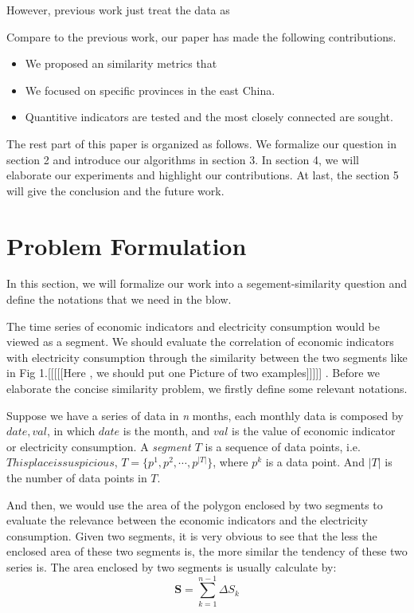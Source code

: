 \documentclass{sig-alternate-05-2015}
\begin{document}
However, previous work just treat the data as 

Compare to the previous work, our paper has made the following contributions.
\begin{itemize}
	\item We proposed an similarity metrics that 
	\item We focused on specific provinces in the east China.
	\item Quantitive indicators are tested and the most closely connected are sought.
\end{itemize}

The rest part of this paper is organized as follows. We formalize our question in section 2 and introduce our algorithms in section 3. In section 4, we will elaborate our experiments and highlight our contributions. At last, the section 5 will give the conclusion and the future work.

\section{Problem Formulation}
In this section, we will formalize our work into a segement-similarity question and define the notations that we need in the blow.

The time series of economic indicators and electricity consumption would be viewed as a segment. We should evaluate the correlation of economic indicators with electricity consumption through the similarity between the two segments like in Fig 1.[[[[[Here , we should  put one Picture of two examples]]]]] . Before we elaborate the concise similarity problem, we firstly define some relevant notations.
\newcommand{\loci}[1]{\ensuremath{p^{#1}}}
\begin{definition}
Suppose we have a series of data in \textit{n} months, each monthly data is composed by \textbf{\(date, val\)}, in which $date$ is the month, and $val$ is the value of economic indicator or electricity consumption. A \textit{segment $T$} is a sequence of data points, i.e.$This place is suspicious$, $T=\{\loci{1}, \loci{2}, \cdots, \loci{|T|}\}$,  where $\loci{k}$ is a data point. And $|T|$ is the number of data points in $T$.
\end{definition}

And then, we would use the area of the polygon enclosed by two segments to evaluate the relevance between the economic indicators and the electricity consumption. Given two segments, it is very obvious to see that the less the enclosed area of these two segments is, the more similar the tendency of these two series is. The area enclosed by two segments is usually calculate by:
\begin{displaymath}
\textbf{S} = \sum_{k=1}^{n-1}\Delta S_k	
\end{displaymath}
\end{document}
